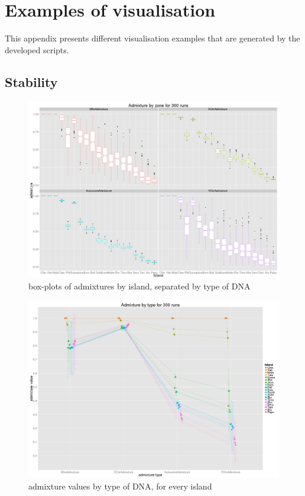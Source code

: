 \documentclass[a4paper,12pt]{report}
\begin{document}
\chapter{Examples of visualisation}
\label{app:ex-visu}

This appendix presents different visualisation examples that are generated by the developed scripts.

\section{Stability}
\begin{figure}[ht]
	\centering
	\includegraphics[scale=0.22]{../data/stability.png}
	\caption{box-plots of admixtures by island, separated by type of DNA}
	\label{app:stability}
\end{figure}

\begin{figure}[ht]
	\centering
	\includegraphics[scale=0.22]{../data/stability-admixGradient.png}
	\caption{admixture values by type of DNA, for every island}
	\label{app:stability-admixGradient}
\end{figure}
\end{document}
